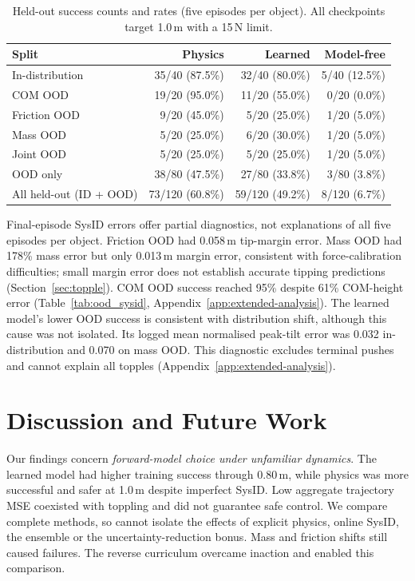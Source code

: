 \documentclass[12pt]{article}
\begin{document}
\begin{table}[htbp]
\centering
\small
\begin{tabular}{lrrr}
\toprule
Split & Physics & Learned & Model-free \\
\midrule
In-distribution & 35/40 (87.5\%) & 32/40 (80.0\%) & 5/40 (12.5\%) \\
COM OOD & 19/20 (95.0\%) & 11/20 (55.0\%) & 0/20 (0.0\%) \\
Friction OOD & 9/20 (45.0\%) & 5/20 (25.0\%) & 1/20 (5.0\%) \\
Mass OOD & 5/20 (25.0\%) & 6/20 (30.0\%) & 1/20 (5.0\%) \\
Joint OOD & 5/20 (25.0\%) & 5/20 (25.0\%) & 1/20 (5.0\%) \\
\midrule
OOD only & 38/80 (47.5\%) & 27/80 (33.8\%) & 3/80 (3.8\%) \\
All held-out (ID + OOD) & 73/120 (60.8\%) & 59/120 (49.2\%) & 8/120 (6.7\%) \\
\bottomrule
\end{tabular}
\caption{Held-out success counts and rates (five episodes per object). All checkpoints target 1.0\,m with a 15\,N limit.}
\label{tab:ood}
\end{table}
Final-episode SysID errors offer partial diagnostics, not explanations of all five episodes per object. Friction OOD had 0.058\,m tip-margin error. Mass OOD had 178\% mass error but only 0.013\,m margin error, consistent with force-calibration difficulties; small margin error does not establish accurate tipping predictions (Section~\ref{sec:topple}). COM OOD success reached 95\% despite 61\% COM-height error (Table~\ref{tab:ood_sysid}, Appendix~\ref{app:extended-analysis}). The learned model's lower OOD success is consistent with distribution shift, although this cause was not isolated. Its logged mean normalised peak-tilt error was 0.032 in-distribution and 0.070 on mass OOD. This diagnostic excludes terminal pushes and cannot explain all topples (Appendix~\ref{app:extended-analysis}).


\section{Discussion and Future Work}\label{sec:discussion}
Our findings concern \emph{forward-model choice under unfamiliar dynamics}. The learned model had higher training success through 0.80\,m, while physics was more successful and safer at 1.0\,m despite imperfect SysID. Low aggregate trajectory MSE coexisted with toppling and did not guarantee safe control. We compare complete methods, so cannot isolate the effects of explicit physics, online SysID, the ensemble or the uncertainty-reduction bonus. Mass and friction shifts still caused failures. The reverse curriculum overcame inaction and enabled this comparison.
\end{document}
